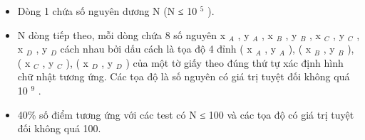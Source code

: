 \begin{itemize}
	\item     Dòng 1 chứa số nguyên dương N (N ≤ 10    $^     5    $    ).   
	\item     N dòng tiếp theo, mỗi dòng chứa 8 số nguyên x    $_     A    $    , y    $_     A    $    , x    $_     B    $    , y    $_     B    $    , x    $_     C    $    , y    $_     C    $    , x    $_     D    $    , y    $_     D    $    cách nhau bởi dấu cách là tọa độ 4 đỉnh (         x    $_     A    $     , y     $_      A     $     ), (           x     $_      B     $      , y     $_      B     $     ), (           x     $_      C     $      , y     $_      C     $     ), (           x     $_      D     $      , y     $_      D     $     ) của một tờ giấy theo đúng thứ tự xác định hình chữ nhật tương ứng. Các tọa độ là số nguyên có giá trị tuyệt đối không quá 10     $^      9     $     .    
	\item      40\% số điểm tương ứng với các test có N         ≤ 100 và các tọa độ có giá trị tuyệt đối không quá 100.    
\end{itemize}